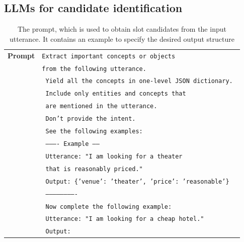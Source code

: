 \subsection{LLMs for candidate identification}
\begin{table}[tp]
    \centering
    \begin{tabular}{r|l}
    \toprule
        \textbf{Prompt} & \texttt{{\color{cyan!80!yellow!80!black!100 }Extract important concepts or objects }}\\
        & \texttt{{\color{cyan!80!yellow!80!black!100 }from the following utterance. }} \\
        & \texttt{{\color{cyan!80!yellow!80!black!100 } Yield all the concepts in one-level JSON dictionary. }} \\
        & \texttt{{\color{cyan!80!yellow!80!black!100 } Include only entities and concepts that}} \\
        & \texttt{{\color{cyan!80!yellow!80!black!100 } are mentioned in the utterance.}} \\
        & \texttt{{\color{cyan!80!yellow!80!black!100 } Don't provide the intent.}} \\
        & \texttt{{\color{cyan!80!yellow!80!black!100 } See the following examples:}} \\
        & \texttt{{\color{orange!50!yellow!90!black!100!} ---------- Example ------}} \\
        & \texttt{{\color{orange!50!yellow!90!black!100!} Utterance: "I am looking for a theater }} \\
        & \texttt{{\color{orange!50!yellow!90!black!100!} that is reasonably priced." }} \\
        & \texttt{{\color{orange!50!yellow!90!black!100!} Output: \{'venue': 'theater', 'price': 'reasonable'\} }} \\
        & \texttt{{\color{orange!50!yellow!90!black!100!} -------------------------}} \\
        & \texttt{{\color{cyan!80!yellow!80!black!100 } Now complete the following example: }} \\
        & \texttt{{\color{cyan!80!yellow!80!black!100 } Utterance:}  {\color{red!100!yellow!90!black!100!}"I am looking for a cheap hotel."}} \\
        & \texttt{{\color{cyan!80!yellow!80!black!100 } Output:  }} \\
        \bottomrule
    \end{tabular}
    \caption{The {\color{cyan!80!yellow!80!black!100 }prompt}, which is used to obtain slot candidates from the input utterance. It contains an {\color{orange!50!yellow!90!black!100!} example} to specify the desired output structure }
    \label{04:tab:prompt}
\end{table}

